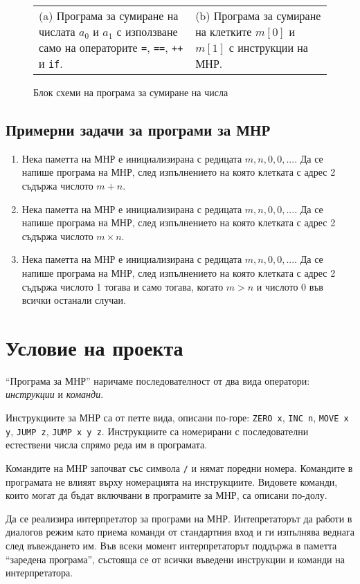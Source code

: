 \documentclass[12pt,a4paper]{article}
\newcommand{\code}[1]{\texttt{#1}}
\begin{document}
{\begin{figure}
\begin{tabular}{p{7cm} p{7cm}}
      \\
      (a) Програма за сумиране на числата $a_0$ и $a_1$ с използване само на операторите \code{=}, \code{==}, \code{++} и \code{if}.
      &
      (b) Програма за сумиране на клетките $m[0]$ и $m[1]$ с инструкции на МНР.
  \end{tabular}

  \caption{Блок схеми на програма за сумиране на числа}
  \label{fig:mnr}
\end{figure}

\subsection{Примерни задачи за програми за МНР}


\begin{enumerate}[resume]
	\item Нека паметта на МНР е инициализирана с редицата $m,n,0,0,...$. Да се напише програма на МНР, след изпълнението на която клетката с адрес 2 съдържа числото $m+n$.
	\item Нека паметта на МНР е инициализирана с редицата $m,n,0,0,...$. Да се напише програма на МНР, след изпълнението на която клетката с адрес 2 съдържа числото $m \times n$.
	\item Нека паметта на МНР е инициализирана с редицата $m,n,0,0,...$. Да се напише програма на МНР, след изпълнението на която клетката с адрес 2 съдържа числото 1 тогава и само тогава, когато $m>n$ и числото 0 във всички останали случаи.
\end{enumerate}

\section{Условие на проекта}

``Програма за МНР'' наричаме последователност от два вида оператори: \emph{инструкции} и \emph{команди}.

Инструкциите за МНР са от петте вида, описани по-горе: \code{ZERO x}, \code{INC n}, \code{MOVE x y}, \code{JUMP z}, \code{JUMP x y z}. Инструкциите са номерирани с последователни естествени числа спрямо реда им в програмата.

Командите на МНР започват със символа \code{/} и нямат поредни номера. Командите в програмата не влияят върху номерацията на инструкциите. Видовете команди, които могат да бъдат включвани в програмите за МНР, са описани по-долу.

Да се реализира интерпретатор за програми на МНР. Интепретаторът да работи в диалогов режим като приема команди от стандартния вход и ги изпълнява веднага след въвеждането им. Във всеки момент интерпретаторът поддържа в паметта ``заредена програма'', състояща се от всички въведени инструкции и команди на интерпретатора.

}
\end{document}
